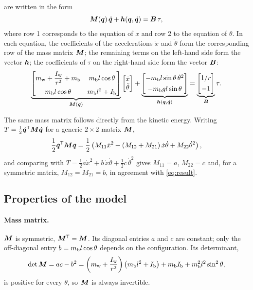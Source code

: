 are written in the form
\begin{equation}
  \bm{M}(\bm{q})\,\ddot{\bm{q}} + \bm{h}(\bm{q},\dot{\bm{q}}) = \bm{B}\,\tau ,
  \label{eq:manipulator}
\end{equation}
where row 1 corresponds to the equation of $x$ and row 2 to the equation of
$\theta$. In each equation, the coefficients of the accelerations $\ddot x$ and
$\ddot\theta$ form the corresponding row of the mass matrix $\bm{M}$; the remaining
terms on the left-hand side form the vector $\bm{h}$; the coefficients of $\tau$
on the right-hand side form the vector $\bm{B}$:
\begin{equation}
  \underbrace{\begin{bmatrix}
     m_{\mathrm w} + \dfrac{I_{\mathrm w}}{r^2} + m_{\mathrm b} & m_{\mathrm b} l\cos\theta \\[8pt]
     m_{\mathrm b} l\cos\theta & m_{\mathrm b} l^2 + I_{\mathrm b}
  \end{bmatrix}}_{\bm{M}(\bm{q})}
  \begin{bmatrix} \ddot x \\ \ddot\theta \end{bmatrix}
  +
  \underbrace{\begin{bmatrix}
     -m_{\mathrm b} l\sin\theta\,\dot\theta^2 \\[4pt]
     -m_{\mathrm b} g l\sin\theta
  \end{bmatrix}}_{\bm{h}(\bm{q},\dot{\bm{q}})}
  =
  \underbrace{\begin{bmatrix} 1/r \\[4pt] -1 \end{bmatrix}}_{\bm{B}}\tau .
  \label{eq:result}
\end{equation}

The same mass matrix follows directly from the kinetic energy. Writing
$T = \frac12\dot{\bm{q}}^{\mathsf T}\bm{M}\dot{\bm{q}}$ for a generic $2\times2$ matrix $\bm{M}$,
\begin{equation}
  \frac12\dot{\bm{q}}^{\mathsf T}\bm{M}\dot{\bm{q}}
  = \frac12\left(M_{11}\dot x^2 + (M_{12}+M_{21})\,\dot x\dot\theta + M_{22}\dot\theta^2\right),
\end{equation}
and comparing with $T = \frac12 a\dot x^2 + b\,\dot x\dot\theta + \frac12 c\,\dot\theta^2$
gives $M_{11} = a$, $M_{22} = c$ and, for a symmetric matrix,
$M_{12} = M_{21} = b$, in agreement with \cref{eq:result}.

\subsection{Properties of the model}

\paragraph{Mass matrix.}
$\bm{M}$ is symmetric, $\bm{M}^{\mathsf T} = \bm{M}$. Its diagonal entries $a$ and $c$
are constant; only the off-diagonal entry $b = m_{\mathrm b} l\cos\theta$ depends on the
configuration. Its determinant,
\begin{equation}
  \det\bm{M} = ac - b^2
  = \left(m_{\mathrm w} + \frac{I_{\mathrm w}}{r^2}\right)\left(m_{\mathrm b} l^2 + I_{\mathrm b}\right) + m_{\mathrm b}I_{\mathrm b} + m_{\mathrm b}^2 l^2\sin^2\theta ,
\end{equation}
is positive for every $\theta$, so $\bm{M}$ is always invertible.


